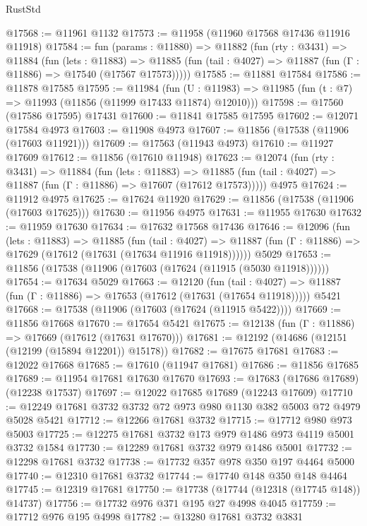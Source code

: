 \begin{lexlean}{RustStd}
\begin{coremodule}
@17568 := @11961 @1132
@17573 := @11958 (@11960 @17568 @17436 @11916 @11918)
@17584 := fun (params : @11880) =>
  @11882
    (fun (rty : @3431) =>
    @11884
      (fun (lets : @11883) =>
      @11885 (fun (tail : @4027) => @11887 (fun (Γ : @11886) => @17540 (@17567 @17573)))))
@17585 := @11881 @17584
@17586 := @11878 @17585
@17595 := @11984
    (fun (U : @11983) => @11985 (fun (t : @7) => @11993 (@11856 (@11999 @17433 @11874) @12010)))
@17598 := @17560 (@17586 @17595) @17431
@17600 := @11841 @17585 @17595
@17602 := @12071 @17584 @4973
@17603 := @11908 @4973
@17607 := @11856 (@17538 (@11906 (@17603 @11921)))
@17609 := @17563 (@11943 @4973)
@17610 := @11927 @17609
@17612 := @11856 (@17610 @11948)
@17623 := @12074
    (fun (rty : @3431) =>
    @11884
      (fun (lets : @11883) =>
      @11885 (fun (tail : @4027) => @11887 (fun (Γ : @11886) => @17607 (@17612 @17573)))))
    @4975
@17624 := @11912 @4975
@17625 := @17624 @11920
@17629 := @11856 (@17538 (@11906 (@17603 @17625)))
@17630 := @11956 @4975
@17631 := @11955 @17630
@17632 := @11959 @17630
@17634 := @17632 @17568 @17436
@17646 := @12096
    (fun (lets : @11883) =>
    @11885
      (fun (tail : @4027) =>
      @11887 (fun (Γ : @11886) => @17629 (@17612 (@17631 (@17634 @11916 @11918))))))
    @5029
@17653 := @11856 (@17538 (@11906 (@17603 (@17624 (@11915 (@5030 @11918))))))
@17654 := @17634 @5029
@17663 := @12120
    (fun (tail : @4027) => @11887 (fun (Γ : @11886) => @17653 (@17612 (@17631 (@17654 @11918)))))
    @5421
@17668 := @17538 (@11906 (@17603 (@17624 (@11915 @5422))))
@17669 := @11856 @17668
@17670 := @17654 @5421
@17675 := @12138 (fun (Γ : @11886) => @17669 (@17612 (@17631 @17670)))
@17681 := @12192 (@14686 (@12151 (@12199 (@15894 @12201)) @15178))
@17682 := @17675 @17681
@17683 := @12022 @17668
@17685 := @17610 (@11947 @17681)
@17686 := @11856 @17685
@17689 := @11954 @17681 @17630 @17670
@17693 := @17683 (@17686 @17689) (@12238 @17537)
@17697 := @12022 @17685 @17689 (@12243 @17609)
@17710 := @12249 @17681 @3732 @3732 @72 @973 @980 @1130 @382 @5003 @72 @4979 @5028 @5421
@17712 := @12266 @17681 @3732
@17715 := @17712 @980 @973 @5003
@17725 := @12275 @17681 @3732 @173 @979 @1486 @973 @4119 @5001 @3732 @1584
@17730 := @12289 @17681 @3732 @979 @1486 @5001
@17732 := @12298 @17681 @3732
@17738 := @17732 @357 @978 @350 @197 @4464 @5000
@17740 := @12310 @17681 @3732
@17744 := @17740 @148 @350 @148 @4464
@17745 := @12319 @17681
@17750 := @17738 (@17744 (@12318 (@17745 @148)) @14737)
@17756 := @17732 @976 @371 @195 @27 @4998 @4045
@17759 := @17712 @976 @195 @4998
@17782 := @13280
    @17681
    @3732
    @3831

\end{coremodule}
\end{lexlean}
